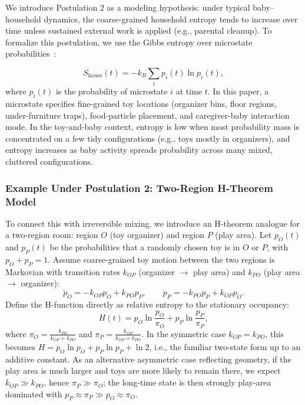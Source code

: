 \documentclass[11pt]{article}
\begin{document}
We introduce Postulation 2 as a modeling hypothesis: under typical baby--household dynamics, the coarse-grained household entropy tends to increase over time unless sustained external work is applied (e.g., parental cleanup). To formalize this postulation, we use the Gibbs entropy over microstate probabilities~\cite{Gibbs1902,jaynes1965}:

\begin{equation}
S_{\text{house}}(t)=-k_B\sum_{i} p_i(t)\ln p_i(t),
\end{equation}
where $p_i(t)$ is the probability of microstate $i$ at time $t$. In this paper, a microstate specifies fine-grained toy locations (organizer bins, floor regions, under-furniture traps), food-particle placement, and caregiver-baby interaction mode. In the toy-and-baby context, entropy is low when most probability mass is concentrated on a few tidy configurations (e.g., toys mostly in organizers), and entropy increases as baby activity spreads probability across many mixed, cluttered configurations.

\subsubsection*{Example Under Postulation 2: Two-Region H-Theorem Model}
To connect this with irreversible mixing, we introduce an H-theorem analogue for a two-region room: region $O$ (toy organizer) and region $P$ (play area). Let $p_O(t)$ and $p_P(t)$ be the probabilities that a randomly chosen toy is in $O$ or $P$, with $p_O+p_P=1$.
Assume coarse-grained toy motion between the two regions is Markovian with transition rates $k_{OP}$ (organizer $\to$ play area) and $k_{PO}$ (play area $\to$ organizer):
\begin{equation}
\dot p_O=-k_{OP}p_O+k_{PO}p_P, \qquad \dot p_P=-k_{PO}p_P+k_{OP}p_O.
\end{equation}
Define the H-function directly as relative entropy to the stationary occupancy:
\begin{equation}
H(t)=p_O\ln\!\frac{p_O}{\pi_O}+p_P\ln\!\frac{p_P}{\pi_P},
\end{equation}
where $\pi_O=\frac{k_{PO}}{k_{OP}+k_{PO}}$ and $\pi_P=\frac{k_{OP}}{k_{OP}+k_{PO}}$. In the symmetric case $k_{OP}=k_{PO}$, this becomes $H=p_O\ln p_O+p_P\ln p_P+\ln 2$, i.e., the familiar two-state form up to an additive constant. As an alternative asymmetric case reflecting geometry, if the play area is much larger and toys are more likely to remain there, we expect $k_{OP}\gg k_{PO}$, hence $\pi_P\gg \pi_O$; the long-time state is then strongly play-area dominated with $p_P\approx \pi_P\gg p_O\approx \pi_O$.
\end{document}
